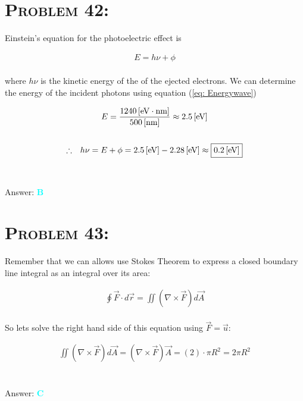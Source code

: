 \documentclass{article}
\begin{document}
\section{\textsc{Problem 42:}} Einstein's equation for the photoelectric effect is 

\begin{gather}
E = h \nu + \phi
\end{gather}
\\
where $h \nu$ is the kinetic energy of the of the ejected electrons. We can determine the energy of the incident photons using equation (\ref{eq: Energywave})

\begin{gather}
E = \frac{\unit[1240]{[eV \cdot nm]}}{\unit[500]{[nm]}} \approx \unit[2.5]{[eV]}\nonumber\\
\nonumber\\
\therefore \hspace{.1in} h \nu = E + \phi = \unit[2.5]{[eV]} - \unit[2.28]{[eV]} \approx \boxed{\unit[0.2]{[eV]}}\nonumber
\end{gather}
\\\\
Answer: \textbf{\textcolor{cyan}B}\\


\section{\textsc{Problem 43:}} Remember that we can allows use Stokes Theorem to express a closed boundary line integral as an integral over its area:

\begin{gather}
\oint{\vec{F} \cdot d\vec{r}} = \iint{\left(\nabla \times \vec{F} \right) d\vec{A}}
\end{gather}
\\
So lets solve the right hand side of this equation using $\vec{F} = \vec{u}$:

\begin{gather}
\iint{\left(\nabla \times \vec{F} \right) d\vec{A}} = \left(\nabla \times \vec{F} \right) \vec{A} = (2) \cdot \pi R^{2} = \boxed{2 \pi R^{2} }\nonumber
\end{gather}
\\\\
Answer: \textbf{\textcolor{cyan}C}\\

\end{document}
